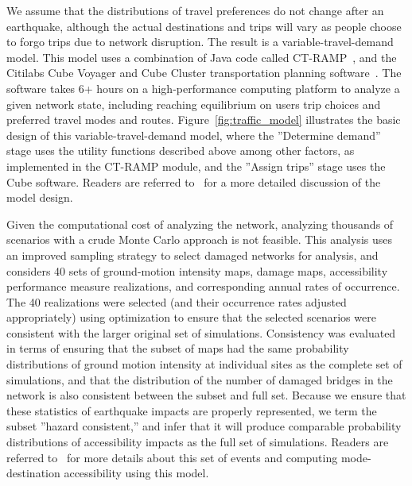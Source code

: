 We assume that the distributions of travel preferences do not change after an earthquake, although the actual destinations and trips will vary as people choose to forgo trips due to network disruption. The result is a variable-travel-demand model. This model uses a combination of Java code called CT-RAMP~\cite{davidson_ct-ramp_2010}, and the Citilabs Cube Voyager and Cube Cluster transportation planning software~\cite{erhardt_mtcs_2012}. The software takes 6+ hours on a high-performance computing platform to analyze a given network state, including reaching equilibrium on users trip choices and preferred travel modes and routes. Figure~\ref{fig:traffic_model} illustrates the basic design of this variable-travel-demand model, where the ''Determine demand'' stage uses the utility functions described above among other factors, as implemented in the CT-RAMP module, and the ''Assign trips'' stage uses the Cube software. Readers are referred to~\cite{miller_seismic_2014} for a more detailed discussion of the model design. 

Given the computational cost of analyzing the network, analyzing thousands of scenarios with a crude Monte Carlo approach is not feasible. This analysis uses an improved sampling strategy to select damaged networks for analysis, and considers 40 sets of ground-motion intensity maps, damage maps, accessibility performance measure realizations, and corresponding annual rates of occurrence. 
The 40 realizations were selected (and their occurrence rates adjusted appropriately) using optimization to ensure that the selected scenarios were consistent with the larger original set of simulations. 
Consistency was evaluated in terms of ensuring that the subset of maps had the same probability distributions of ground motion intensity at individual sites as the complete set of simulations, and that the distribution of the number of damaged bridges in the network is also consistent between the subset and full set. 
Because we ensure that these statistics of earthquake impacts are properly represented, we term the subset ''hazard consistent,'' and infer that it will produce comparable probability distributions of accessibility impacts as the full set of simulations.
Readers are referred to~\cite{miller_seismic_2014} for more details about this set of events and computing mode-destination accessibility using this model. 


